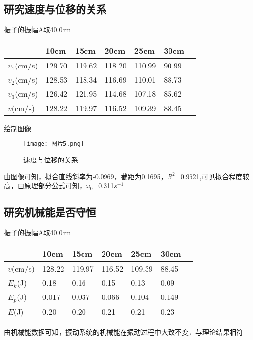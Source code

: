 \documentclass[11pt,a4paper]{article}
\begin{document}
    \subsection{研究速度与位移的关系}
    振子的振幅A取40.0cm
    \begin{table}[H]
        \centering
        \begin{tabular}{|l|l|l|l|l|l|l|}
        \hline
           &10cm&15cm&20cm&25cm&30cm\\\hline
           $v_1$(cm/s)&129.70&119.62&118.20&110.99&90.99\\\hline
           $v_2$(cm/s)&128.53&118.34&116.69&110.01&88.73\\\hline
           $v_3$(cm/s)&126.42&121.95&114.68&107.18&85.62\\\hline
           $v$(cm/s)&128.22&119.97&116.52&109.39&88.45\\\hline
        \end{tabular}
    \end{table}
    绘制图像
    \begin{figure}[H]
        \centering
        \texttt{[image: 图片5.png]}
        \caption{速度与位移的关系}
    \end{figure}
    由图像可知，拟合直线斜率为-0.0969，截距为0.1695，$R^2$=0.9621,可见拟合程度较高，由原理部分公式可知，${\omega _0}$=0.311$s^{-1}$
    \subsection{研究机械能是否守恒}
    振子的振幅A取40.0cm
    \begin{table}[H]
        \centering
        \begin{tabular}{|l|l|l|l|l|l|l|}
        \hline
        &10cm&15cm&20cm&25cm&30cm\\\hline
        $v$(cm/s)&128.22&119.97&116.52&109.39&88.45\\\hline
        $E_k$(J)&0.18&0.16&0.15&0.13&0.09\\\hline
        $E_p$(J)&0.017&0.037&0.066&0.104&0.149\\\hline
        $E$(J)&0.20&0.20&0.21&0.21&0.23\\\hline
        \end{tabular}
    \end{table}
    由机械能数据可知，振动系统的机械能在振动过程中大致不变，与理论结果相符
\end{document}
